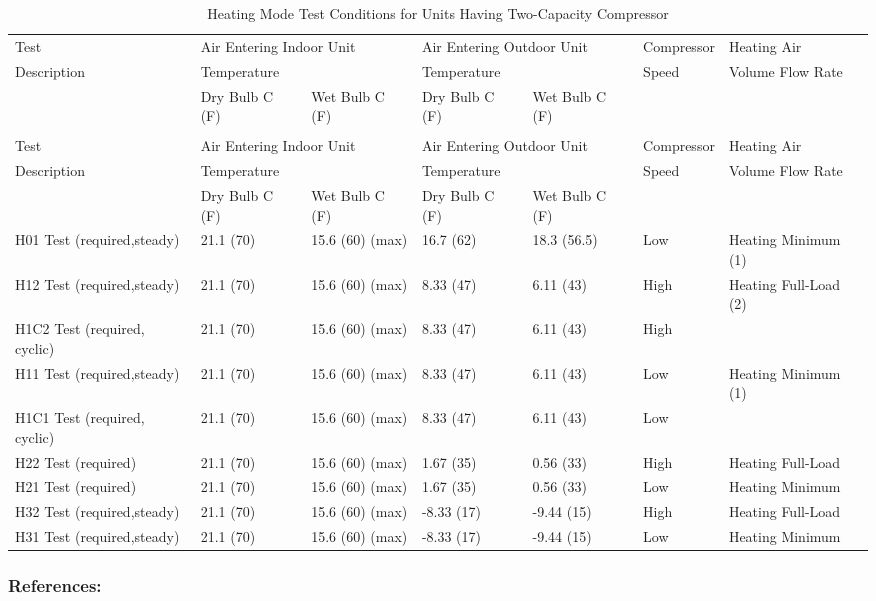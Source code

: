 \begin{longtable}[c]{p{0.85in}p{0.85in}p{0.85in}p{0.85in}p{0.85in}p{0.85in}p{0.85in}}
\caption{Heating Mode Test Conditions for Units Having Two-Capacity Compressor \label{table:heating-mode-test-conditions-for-units-having-001}} \tabularnewline
\toprule 
Test & \multicolumn{2}{l}{Air Entering Indoor Unit} & \multicolumn{2}{l}{Air Entering Outdoor Unit} & Compressor & Heating Air \tabularnewline
Description & Temperature &  & Temperature &  & Speed & Volume Flow Rate \tabularnewline
\midrule
& Dry Bulb C (F) & Wet Bulb C (F) & Dry Bulb C (F) & Wet Bulb C (F) \tabularnewline
\midrule
\endfirsthead

\caption[]{Heating Mode Test Conditions for Units Having Two-Capacity Compressor} \tabularnewline
\toprule
Test & \multicolumn{2}{l}{Air Entering Indoor Unit} & \multicolumn{2}{l}{Air Entering Outdoor Unit} & Compressor & Heating Air \tabularnewline
Description & Temperature &  & Temperature &  & Speed & Volume Flow Rate \tabularnewline
\midrule
& Dry Bulb C (F) & Wet Bulb C (F) & Dry Bulb C (F) & Wet Bulb C (F) \tabularnewline
\midrule
\endhead

H01 Test (required,steady) & 21.1 (70) & 15.6 (60) (max) & 16.7 (62) & 18.3 (56.5) & Low & Heating Minimum (1) \tabularnewline
H12 Test (required,steady) & 21.1 (70) & 15.6 (60) (max) & 8.33 (47) & 6.11 (43) & High & Heating Full-Load (2) \tabularnewline
H1C2 Test (required, cyclic) & 21.1 (70) & 15.6 (60) (max) & 8.33 (47) & 6.11 (43) & High &  \tabularnewline
H11 Test (required,steady) & 21.1 (70) & 15.6 (60) (max) & 8.33 (47) & 6.11 (43) & Low & Heating Minimum (1) \tabularnewline
H1C1 Test (required, cyclic) & 21.1 (70) & 15.6 (60) (max) & 8.33 (47) & 6.11 (43) & Low &  \tabularnewline
H22 Test (required) & 21.1 (70) & 15.6 (60) (max) & 1.67 (35) & 0.56 (33) & High & Heating Full-Load \tabularnewline
H21 Test (required) & 21.1 (70) & 15.6 (60) (max) & 1.67 (35) & 0.56 (33) & Low & Heating Minimum \tabularnewline
H32 Test (required,steady) & 21.1 (70) & 15.6 (60) (max) & -8.33 (17) & -9.44 (15) & High & Heating Full-Load \tabularnewline
H31 Test (required,steady) & 21.1 (70) & 15.6 (60) (max) & -8.33 (17) & -9.44 (15) & Low & Heating Minimum \tabularnewline
\bottomrule
\end{longtable}

\subsubsection{References:}\label{references-6-000}

